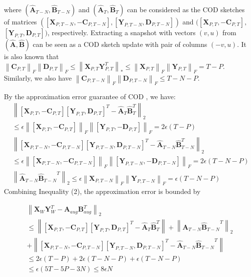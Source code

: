 where $(\hat{\boldsymbol{A}}_{T-N},\hat{\boldsymbol{B}}_{T-N})$ and $(\hat{\boldsymbol{A}}_T,\hat{\boldsymbol{B}}_T)$ can be considered as the COD sketches of matrices $([\boldsymbol{X}_{P,T-N},- \boldsymbol{C}_{P,T-N}], [\boldsymbol{Y}_{P,T-N},\boldsymbol{D}_{P,T-N}])$ and $([\boldsymbol{X}_{P,T},-\boldsymbol{C}_{P,T}],$ $[\boldsymbol{Y}_{P,T},\boldsymbol{D}_{P,T}])$, respectively. Extracting a snapshot with vectors $(v,u)$ from $(\hat{\boldsymbol{A}},\hat{\boldsymbol{B}})$ can be seen as a COD sketch update with pair of columns $(-v,u)$. It is also known that $\left\|\boldsymbol{C}_{P,T} \right\|_F\left\|\boldsymbol{D}_{P,T} \right\|_F\leq \left\|\boldsymbol{X}_{P,T}\boldsymbol{Y}_{P,T}^T\right\|_*\leq \left\|\boldsymbol{X}_{P,T} \right\|_F\left\|\boldsymbol{Y}_{P,T} \right\|_F = T - P$. Similarly, we also have $\left\|\boldsymbol{C}_{P,T-N} \right\|_F\left\|\boldsymbol{D}_{P,T-N} \right\|_F\leq T - N - P$.

By the approximation error guarantee of COD \cite{MrouehMG17}, we have:
    \begin{align}
        & \left\| [\boldsymbol{X}_{P,T},-\boldsymbol{C}_{P,T}][\boldsymbol{Y}_{P,T},\boldsymbol{D}_{P,T}]^T - \hat{\boldsymbol{A}}_T\hat{\boldsymbol{B}}_T^T \right\|_2 \nonumber \\
        & \leq \epsilon \left\| [\boldsymbol{X}_{P,T},-\boldsymbol{C}_{P,T}]\right\|_F\left\| [\boldsymbol{Y}_{P,T},-\boldsymbol{D}_{P,T}]\right\|_F = 2\epsilon(T-P) \nonumber \\
        & \left\| [\boldsymbol{X}_{P,T-N},-\boldsymbol{C}_{P,T-N}][\boldsymbol{Y}_{P,T-N},\boldsymbol{D}_{P,T-N}]^T - \hat{\boldsymbol{A}}_{T-N}\hat{\boldsymbol{B}}_{T-N}^T \right\|_2 \nonumber \\
        & \leq \epsilon \left\| [\boldsymbol{X}_{P,T-N},-\boldsymbol{C}_{P,T-N}]\right\|_F\left\| [\boldsymbol{Y}_{P,T-N},-\boldsymbol{D}_{P,T-N}]\right\|_F = 2\epsilon(T-N-P) \nonumber \\
        & \left\|\hat{\boldsymbol{A}}_{T-N}{\hat{\boldsymbol{B}}_{T-N}}^T \right\|_2\leq \epsilon\left\|\boldsymbol{X}_{P,T-N} \right\|_F \left\|\boldsymbol{Y}_{P,T-N} \right\|_F = \epsilon(T - N - P)
    \end{align}
\noindent
Combining Inequality (2), the approximation error is bounded by

\begin{align}
    & \left\| \boldsymbol{X}_W\boldsymbol{Y}_W^T - \boldsymbol{A}_{aug}\boldsymbol{B}_{aug}^T\right\|_2 \nonumber \\
    & \leq \left\| [\boldsymbol{X}_{P,T},-\boldsymbol{C}_{P,T}][\boldsymbol{Y}_{P,T},\boldsymbol{D}_{P,T}]^T - \hat{\boldsymbol{A}}_T\hat{\boldsymbol{B}}_T^T \right\| + \left\|\hat{\boldsymbol{A}}_{T-N}{\hat{\boldsymbol{B}}_{T-N}}^T \right\|_2 \nonumber \\
    & + \left\| [\boldsymbol{X}_{P,T-N},- \boldsymbol{C}_{P,T-N}][\boldsymbol{Y}_{P,T-N},\boldsymbol{D}_{P,T-N}]^T  - \hat{\boldsymbol{A}}_{T-N}{\hat{\boldsymbol{B}}_{T-N}}^T\right\|  \nonumber \\
    & \leq 2\epsilon(T-P) + 2\epsilon(T-N-P) + \epsilon(T-N-P) \nonumber \\
    & \leq \epsilon(5T - 5P - 3N)  \leq 8\epsilon N
\end{align}


